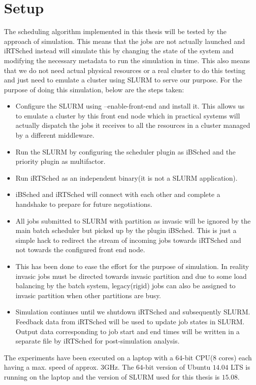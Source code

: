 \section{Setup}
The scheduling algorithm implemented in this thesis will be tested by the approach of simulation. This means that the jobs are not actually launched and iRTSched instead will simulate this by changing the state of the system and modifying the necessary metadata to run the simulation in time. This also means that we do not need actual physical resources or a real cluster to do this testing and just need to emulate a cluster using SLURM to serve our purpose. For the purpose of doing this simulation, below are the steps taken:
\begin{itemize}
\item Configure the SLURM using --enable-front-end and install it. This allows us to emulate a cluster by this front end node which in practical systems will actually dispatch the jobs it receives to all the resources in a cluster managed by a different middleware.
\item Run the SLURM by configuring the scheduler plugin as iBSched and the priority plugin as multifactor.
\item Run iRTSched as an independent binary(it is not a SLURM application).
\item iBSched and iRTSched will connect with each other and complete a handshake to prepare for future negotiations.
\item All jobs submitted to SLURM with partition as invasic will be ignored by the main batch scheduler but picked up by the plugin iBSched. This is just a simple hack to redirect the stream of incoming jobs towards iRTSched and not towards the configured front end node. 
\item This has been done to ease the effort for the purpose of simulation. In reality invasic jobs must be directed towards invasic partition and due to some load balancing by the batch system, legacy(rigid) jobs can also be assigned to invasic partition when other partitions are busy. 
\item Simulation continues until we shutdown iRTSched and subsequently SLURM. Feedback data from iRTSched will be used to update job states in SLURM. Output data corresponding to job start and end times will be written in a separate file by iRTSched for post-simulation analysis.
\end{itemize}
The experiments have been executed on a laptop with a $64$-bit CPU($8$ cores) each having a max. speed of approx. $3$GHz. The $64$-bit version of Ubuntu $14.04$ LTS is running on the laptop and the version of SLURM used for this thesis is $15.08$.
